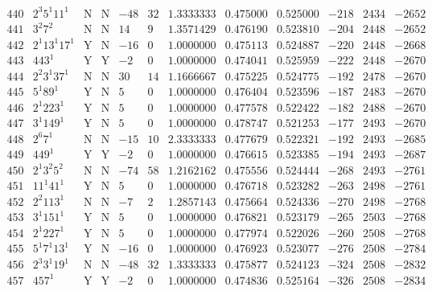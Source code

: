 \documentclass[11pt,reqno,a4letter]{article}
\numberwithin{figure}{section}
\numberwithin{table}{section}
\theoremstyle{plain}
\numberwithin{theorem}{section}
\theoremstyle{definition}
\begin{document}
\begin{table}[h!]
\begin{equation*}
{\begin{array}{cc|cc|ccc|cc|ccc}
 440 & 2^3 5^1 11^1 & \text{N} & \text{N} & -48 & 32 & 1.3333333 & 0.475000 & 0.525000 & -218 & 2434 & -2652 \\
 441 & 3^2 7^2 & \text{N} & \text{N} & 14 & 9 & 1.3571429 & 0.476190 & 0.523810 & -204 & 2448 & -2652 \\
 442 & 2^1 13^1 17^1 & \text{Y} & \text{N} & -16 & 0 & 1.0000000 & 0.475113 & 0.524887 & -220 & 2448 & -2668 \\
 443 & 443^1 & \text{Y} & \text{Y} & -2 & 0 & 1.0000000 & 0.474041 & 0.525959 & -222 & 2448 & -2670 \\
 444 & 2^2 3^1 37^1 & \text{N} & \text{N} & 30 & 14 & 1.1666667 & 0.475225 & 0.524775 & -192 & 2478 & -2670 \\
 445 & 5^1 89^1 & \text{Y} & \text{N} & 5 & 0 & 1.0000000 & 0.476404 & 0.523596 & -187 & 2483 & -2670 \\
 446 & 2^1 223^1 & \text{Y} & \text{N} & 5 & 0 & 1.0000000 & 0.477578 & 0.522422 & -182 & 2488 & -2670 \\
 447 & 3^1 149^1 & \text{Y} & \text{N} & 5 & 0 & 1.0000000 & 0.478747 & 0.521253 & -177 & 2493 & -2670 \\
 448 & 2^6 7^1 & \text{N} & \text{N} & -15 & 10 & 2.3333333 & 0.477679 & 0.522321 & -192 & 2493 & -2685 \\
 449 & 449^1 & \text{Y} & \text{Y} & -2 & 0 & 1.0000000 & 0.476615 & 0.523385 & -194 & 2493 & -2687 \\
 450 & 2^1 3^2 5^2 & \text{N} & \text{N} & -74 & 58 & 1.2162162 & 0.475556 & 0.524444 & -268 & 2493 & -2761 \\
 451 & 11^1 41^1 & \text{Y} & \text{N} & 5 & 0 & 1.0000000 & 0.476718 & 0.523282 & -263 & 2498 & -2761 \\
 452 & 2^2 113^1 & \text{N} & \text{N} & -7 & 2 & 1.2857143 & 0.475664 & 0.524336 & -270 & 2498 & -2768 \\
 453 & 3^1 151^1 & \text{Y} & \text{N} & 5 & 0 & 1.0000000 & 0.476821 & 0.523179 & -265 & 2503 & -2768 \\
 454 & 2^1 227^1 & \text{Y} & \text{N} & 5 & 0 & 1.0000000 & 0.477974 & 0.522026 & -260 & 2508 & -2768 \\
 455 & 5^1 7^1 13^1 & \text{Y} & \text{N} & -16 & 0 & 1.0000000 & 0.476923 & 0.523077 & -276 & 2508 & -2784 \\
 456 & 2^3 3^1 19^1 & \text{N} & \text{N} & -48 & 32 & 1.3333333 & 0.475877 & 0.524123 & -324 & 2508 & -2832 \\
 457 & 457^1 & \text{Y} & \text{Y} & -2 & 0 & 1.0000000 & 0.474836 & 0.525164 & -326 & 2508 & -2834 \\

\end{array}}
\end{equation*}
\end{table}
\end{document}
